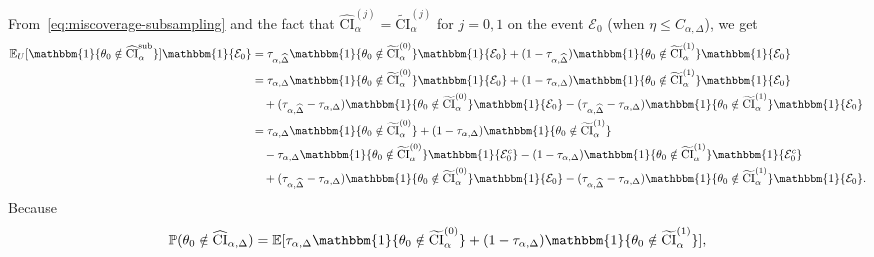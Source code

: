 \documentclass{article}
\numberwithin{myalgctr}{section}
\begin{document}
From~\eqref{eq:miscoverage-subsampling} and the fact that $\widehat{\mathrm{CI}}_{\alpha}^{(j)} = \widetilde{\mathrm{CI}}_{\alpha}^{(j)}$ for $j = 0, 1$ on the event $\mathcal{E}_0$ (when $\eta \le C_{\alpha,\Delta}$), we get
\begin{equation}\label{eq:decomposition-subsampling-miscoverage-exact}
\begin{split}
\mathbb{E}_U[\mathbbm{1}\{\theta_0 \notin \widehat{\mathrm{CI}}_{\alpha}^{\mathrm{sub}}\}]\mathbbm{1}\{\mathcal{E}_0\} &= \tau_{\alpha,\widehat{\Delta}}\mathbbm{1}\{\theta_0 \notin \widetilde{\mathrm{CI}}_{\alpha}^{(0)}\}\mathbbm{1}\{\mathcal{E}_0\} + (1 - \tau_{\alpha,\widehat{\Delta}})\mathbbm{1}\{\theta_0 \notin \widetilde{\mathrm{CI}}_{\alpha}^{(1)}\}\mathbbm{1}\{\mathcal{E}_0\}\\
&= \tau_{\alpha,\Delta}\mathbbm{1}\{\theta_0 \notin \widetilde{\mathrm{CI}}_{\alpha}^{(0)}\}\mathbbm{1}\{\mathcal{E}_0\} + (1 - \tau_{\alpha,\Delta})\mathbbm{1}\{\theta_0 \notin \widetilde{\mathrm{CI}}_{\alpha}^{(1)}\}\mathbbm{1}\{\mathcal{E}_0\}\\
&\quad+ (\tau_{\alpha,\widehat{\Delta}} - \tau_{\alpha,\Delta})\mathbbm{1}\{\theta_0 \notin \widetilde{\mathrm{CI}}_{\alpha}^{(0)}\}\mathbbm{1}\{\mathcal{E}_0\} - (\tau_{\alpha,\widehat{\Delta}} - \tau_{\alpha,\Delta})\mathbbm{1}\{\theta_0 \notin \widetilde{\mathrm{CI}}_{\alpha}^{(1)}\}\mathbbm{1}\{\mathcal{E}_0\}\\
&= \tau_{\alpha,\Delta}\mathbbm{1}\{\theta_0 \notin \widetilde{\mathrm{CI}}_{\alpha}^{(0)}\} + (1 - \tau_{\alpha,\Delta})\mathbbm{1}\{\theta_0 \notin \widetilde{\mathrm{CI}}_{\alpha}^{(1)}\}\\
&\quad- \tau_{\alpha,\Delta}\mathbbm{1}\{\theta_0 \notin \widetilde{\mathrm{CI}}_{\alpha}^{(0)}\}\mathbbm{1}\{\mathcal{E}_0^c\} - (1 - \tau_{\alpha,\Delta})\mathbbm{1}\{\theta_0 \notin \widetilde{\mathrm{CI}}_{\alpha}^{(1)}\}\mathbbm{1}\{\mathcal{E}_0^c\}\\
&\quad+ (\tau_{\alpha,\widehat{\Delta}} - \tau_{\alpha,\Delta})\mathbbm{1}\{\theta_0 \notin \widetilde{\mathrm{CI}}_{\alpha}^{(0)}\}\mathbbm{1}\{\mathcal{E}_0\} - (\tau_{\alpha,\widehat{\Delta}} - \tau_{\alpha,\Delta})\mathbbm{1}\{\theta_0 \notin \widetilde{\mathrm{CI}}_{\alpha}^{(1)}\}\mathbbm{1}\{\mathcal{E}_0\}.
\end{split}
\end{equation}
Because 
\[
\mathbb{P}(\theta_0 \notin \widehat{\mathrm{CI}}_{\alpha,\Delta}) = \mathbb{E}[\tau_{\alpha,\Delta}\mathbbm{1}\{\theta_0 \notin \widetilde{\mathrm{CI}}_{\alpha}^{(0)}\} + (1 - \tau_{\alpha,\Delta})\mathbbm{1}\{\theta_0 \notin \widetilde{\mathrm{CI}}_{\alpha}^{(1)}\}],
\]
\end{document}
